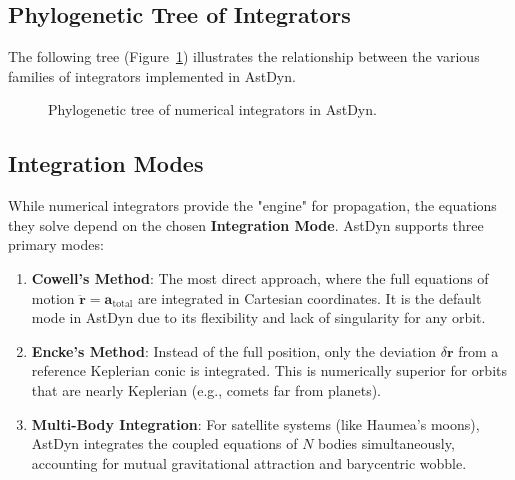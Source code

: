 \subsection{Phylogenetic Tree of Integrators}

The following tree (Figure~\ref{fig:integrator_tree}) illustrates the relationship between the various families of integrators implemented in AstDyn.

\begin{figure}[htbp]
\centering
{}
\caption{Phylogenetic tree of numerical integrators in AstDyn.}
\label{fig:integrator_tree}
\end{figure}

\subsection{Integration Modes}

While numerical integrators provide the "engine" for propagation, the equations they solve depend on the chosen \textbf{Integration Mode}. AstDyn supports three primary modes:

\begin{enumerate}
    \item \textbf{Cowell's Method}: The most direct approach, where the full equations of motion $\ddot{\mathbf{r}} = \mathbf{a}_{\text{total}}$ are integrated in Cartesian coordinates. It is the default mode in AstDyn due to its flexibility and lack of singularity for any orbit.
    \item \textbf{Encke's Method}: Instead of the full position, only the deviation $\delta\mathbf{r}$ from a reference Keplerian conic is integrated. This is numerically superior for orbits that are nearly Keplerian (e.g., comets far from planets).
    \item \textbf{Multi-Body Integration}: For satellite systems (like Haumea's moons), AstDyn integrates the coupled equations of $N$ bodies simultaneously, accounting for mutual gravitational attraction and barycentric wobble.
\end{enumerate}

